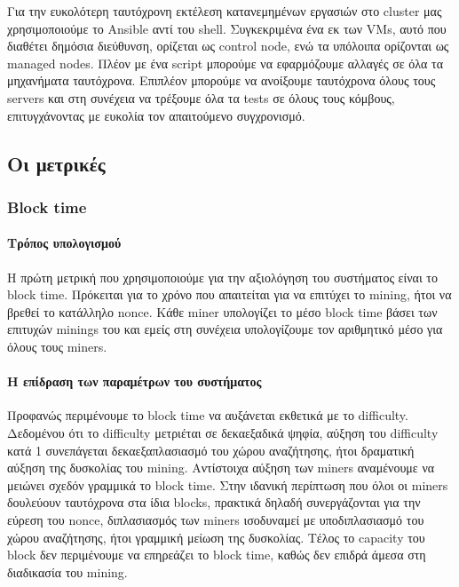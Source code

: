 \documentclass[titlepage]{article}
\begin{document}
Για την ευκολότερη ταυτόχρονη εκτέλεση κατανεμημένων εργασιών στο cluster μας χρησιμοποιούμε το Ansible αντί του shell. Συγκεκριμένα ένα εκ των VMs, αυτό που διαθέτει δημόσια διεύθυνση, ορίζεται ως control node, ενώ τα υπόλοιπα ορίζονται ως managed nodes. Πλέον με ένα script μπορούμε να εφαρμόζουμε αλλαγές σε όλα τα μηχανήματα ταυτόχρονα. Επιπλέον μπορούμε να ανοίξουμε ταυτόχρονα όλους τους servers και στη συνέχεια να τρέξουμε όλα τα tests σε όλους τους κόμβους, επιτυγχάνοντας με ευκολία τον απαιτούμενο συγχρονισμό.

\subsection{Οι μετρικές}

\subsubsection{Block time}

\paragraph{Τρόπος υπολογισμού}

Η πρώτη μετρική που χρησιμοποιούμε για την αξιολόγηση του συστήματος είναι το block time. Πρόκειται για το χρόνο που απαιτείται για να επιτύχει το mining, ήτοι να βρεθεί το κατάλληλο nonce. Κάθε miner υπολογίζει το μέσο block time βάσει των επιτυχών minings του και εμείς στη συνέχεια υπολογίζουμε τον αριθμητικό μέσο για όλους τους miners.

\paragraph{Η επίδραση των παραμέτρων του συστήματος}

Προφανώς περιμένουμε το block time να αυξάνεται εκθετικά με το difficulty. Δεδομένου ότι το difficulty μετριέται σε δεκαεξαδικά ψηφία, αύξηση του difficulty κατά 1 συνεπάγεται δεκαεξαπλασιασμό του χώρου αναζήτησης, ήτοι δραματική αύξηση της δυσκολίας του mining. Αντίστοιχα αύξηση των miners αναμένουμε να μειώνει σχεδόν γραμμικά το block time. Στην ιδανική περίπτωση που όλοι οι miners δουλεύουν ταυτόχρονα στα ίδια blocks, πρακτικά δηλαδή συνεργάζονται για την εύρεση του nonce, διπλασιασμός των miners ισοδυναμεί με υποδιπλασιασμό του χώρου αναζήτησης, ήτοι γραμμική μείωση της δυσκολίας. Τέλος το capacity του block δεν περιμένουμε να επηρεάζει το block time, καθώς δεν επιδρά άμεσα στη διαδικασία του mining.
\end{document}
